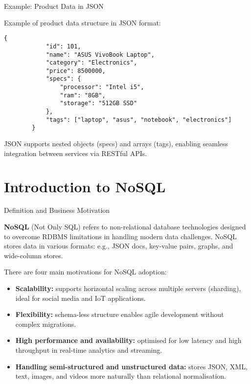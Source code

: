\documentclass[aspectratio=169, table]{beamer}
\begin{document}
\begin{frame}[fragile]{Example: Product Data in JSON}
	\vspace{20pt}
	
	Example of product data structure in JSON format:
	
	\begin{lstlisting}[style=JavaScript, basicstyle=\ttfamily\scriptsize]
		{
			"id": 101,
			"name": "ASUS VivoBook Laptop",
			"category": "Electronics",
			"price": 8500000,
			"specs": {
				"processor": "Intel i5",
				"ram": "8GB",
				"storage": "512GB SSD"
			},
			"tags": ["laptop", "asus", "notebook", "electronics"]
		}
	\end{lstlisting}
	
	\vspace{5pt}
	JSON supports nested objects (specs) and arrays (tags), enabling seamless integration between services via RESTful APIs.
	
\end{frame}

\section{Introduction to NoSQL}

\begin{frame}{Definition and Business Motivation}
	\vspace{20pt}
	
	\textbf{NoSQL} (Not Only SQL) refers to non-relational database technologies designed to overcome RDBMS limitations in handling modern data challenges. NoSQL stores data in various formats: e.g., JSON docs, key-value pairs, graphs, and wide-column stores.
	
	\vspace{10pt}
	There are four main motivations for NoSQL adoption:
	\begin{itemize}
		\item \textbf{Scalability:} supports horizontal scaling across multiple servers (sharding), ideal for social media and IoT applications.
		\item \textbf{Flexibility:} schema-less structure enables agile development without complex migrations.
		\item \textbf{High performance and availability:} optimised for low latency and high throughput in real-time analytics and streaming.
		\item \textbf{Handling semi-structured and unstructured data:} stores JSON, XML, text, images, and videos more naturally than relational normalisation.
	\end{itemize}
	
\end{frame}
\end{document}
